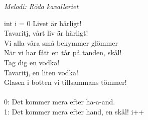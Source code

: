 {\footnotesize\textit{Melodi: Röda kavalleriet}}\par
\vspace{10pt}
int i = 0
\revrpt Livet är härligt!\\
Tavaritj, vårt liv är härligt!\\
Vi alla våra små bekymmer glömmer\\
När vi har fått en tår på tanden, skål!\\
Tag dig en vodka!\\
Tavaritj, en liten vodka!\\
Glasen i botten vi tillsammans tömmer!\\
\\
0: Det kommer mera efter ha-a-and.\\
1: Det kommer mera efter hand, en skål!
i++\rpt

